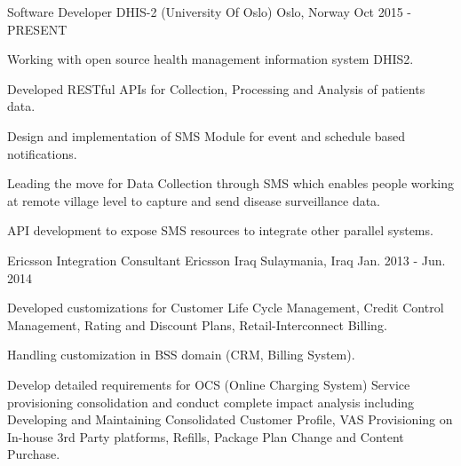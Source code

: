 

\begin{cventries}

  \cventry
    {Software Developer} %
    {DHIS-2 (University Of Oslo)} %
    {Oslo, Norway} %
    {Oct 2015 - PRESENT} %
    {
      \begin{cvitems} %
        \item {Working with open source health management information system DHIS2.}
        \item {Developed RESTful APIs for Collection, Processing and Analysis of patients data.}
        \item {Design and implementation of SMS Module for event and schedule based notifications.}
        \item {Leading the move for Data Collection through SMS which enables people working at remote village level to capture and send disease surveillance data.}
        \item {API development to expose SMS resources to integrate other parallel systems.}
      \end{cvitems}
    }

  \cventry
    {Ericsson Integration Consultant} %
    {Ericsson Iraq} %
    {Sulaymania, Iraq} %
    {Jan. 2013 - Jun. 2014} %
    {
      \begin{cvitems} %
        \item {Developed customizations for Customer Life Cycle Management, Credit Control Management, Rating and Discount Plans, Retail-Interconnect Billing.}
        \item {Handling customization in BSS domain (CRM, Billing System).}
        \item {Develop detailed requirements for OCS (Online Charging System) Service provisioning consolidation and conduct complete impact analysis including Developing and Maintaining Consolidated Customer Profile, VAS Provisioning on In-house 3rd Party platforms, Refills, Package Plan Change and Content Purchase.}
      \end{cvitems}
    }


\end{cventries}
